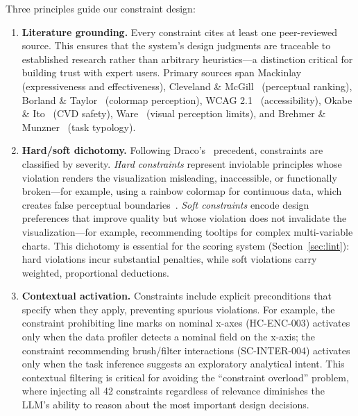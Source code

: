 \documentclass[final,5p,times,twocolumn]{elsarticle}
\begin{document}
Three principles guide our constraint design:

\begin{enumerate}
  \item \textbf{Literature grounding.} Every constraint cites at least one peer-reviewed source. This ensures that the system's design judgments are traceable to established research rather than arbitrary heuristics---a distinction critical for building trust with expert users. Primary sources span Mackinlay~\cite{mackinlay1986automating} (expressiveness and effectiveness), Cleveland \& McGill~\cite{cleveland1984graphical} (perceptual ranking), Borland \& Taylor~\cite{borland2007rainbow} (colormap perception), WCAG 2.1~\cite{wcag21} (accessibility), Okabe \& Ito~\cite{okabe2008color} (CVD safety), Ware~\cite{ware2004information} (visual perception limits), and Brehmer \& Munzner~\cite{brehmer2013multi} (task typology).

  \item \textbf{Hard/soft dichotomy.} Following Draco's~\cite{moritz2018formalizing} precedent, constraints are classified by severity. \textit{Hard constraints} represent inviolable principles whose violation renders the visualization misleading, inaccessible, or functionally broken---for example, using a rainbow colormap for continuous data, which creates false perceptual boundaries~\cite{borland2007rainbow}. \textit{Soft constraints} encode design preferences that improve quality but whose violation does not invalidate the visualization---for example, recommending tooltips for complex multi-variable charts. This dichotomy is essential for the scoring system (Section~\ref{sec:lint}): hard violations incur substantial penalties, while soft violations carry weighted, proportional deductions.

  \item \textbf{Contextual activation.} Constraints include explicit preconditions that specify when they apply, preventing spurious violations. For example, the constraint prohibiting line marks on nominal x-axes (HC-ENC-003) activates only when the data profiler detects a nominal field on the x-axis; the constraint recommending brush/filter interactions (SC-INTER-004) activates only when the task inference suggests an exploratory analytical intent. This contextual filtering is critical for avoiding the ``constraint overload'' problem, where injecting all 42 constraints regardless of relevance diminishes the LLM's ability to reason about the most important design decisions.
\end{enumerate}
\end{document}
